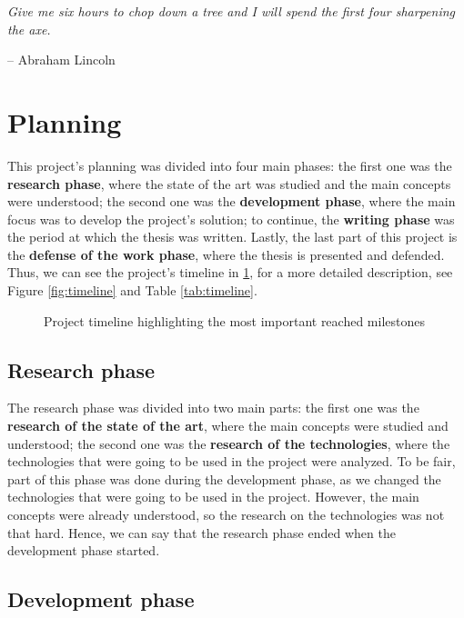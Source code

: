 \epigraph{\textit{Give me six hours to chop down a tree and I will spend the first four sharpening the axe.}}{-- \textup{Abraham Lincoln}}

\section{Planning}

This project's planning was divided into four main phases: the first one was the \textbf{research phase}, where the state of the art was studied and the main concepts were understood; the second one was the \textbf{development phase}, where the main focus was to develop the project's solution; to continue, the \textbf{writing phase} was the period at which the thesis was written. Lastly, the last part of this project is the \textbf{defense of the work phase}, where the thesis is presented and defended. Thus, we can see the project's timeline in \ref{fig:summary_timeline}, for a more detailed description, see Figure \ref{fig:timeline} and Table \ref{tab:timeline}.

\begin{figure}[ht]
    \centering
    
    \caption{Project timeline highlighting the most important reached milestones}
    \label{fig:summary_timeline}
\end{figure}

\subsection{Research phase}

The research phase was divided into two main parts: the first one was the \textbf{research of the state of the art}, where the main concepts were studied and understood; the second one was the \textbf{research of the technologies}, where the technologies that were going to be used in the project were analyzed. To be fair, part of this phase was done during the development phase, as we changed the technologies that were going to be used in the project. However, the main concepts were already understood, so the research on the technologies was not that hard. Hence, we can say that the research phase ended when the development phase started.

\subsection{Development phase}

